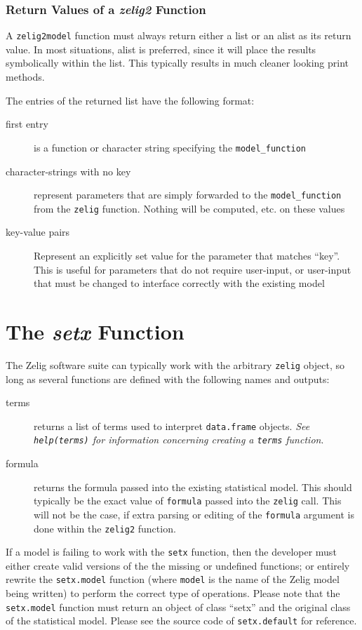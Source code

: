 \documentclass[11pt]{article}
\begin{document}
\subsubsection{Return Values of a \emph{zelig2} Function}

A {\tt zelig2model} function must always return either a list or an alist as its return value.  In most situations, alist is preferred, since it will place the results symbolically within the list.  This typically results in much cleaner looking print methods.

The entries of the returned list have the following format:
\begin{description}
	\item[first entry]{is a function or character string specifying the {\tt model\_function}}
	\item[character-strings with no key]{represent parameters that are simply forwarded to the {\tt model\_function} from the {\tt zelig} function.  Nothing will be computed, etc. on these values}
	\item[key-value pairs]{Represent an explicitly set value for the parameter that matches ``key''.  This is useful for parameters that do not require user-input, or user-input that must be changed to interface correctly with the existing model}
\end{description}


\section{The \emph{setx} Function}
The Zelig software suite can typically work with the arbitrary {\tt zelig} object, so long as several functions are defined with the following names and outputs:

\begin{description}
	\item[terms]{returns a list of terms used to interpret {\tt data.frame} objects.  \emph{See {\tt help(terms)} for information concerning creating a {\tt terms} function}.}
	\item[formula]{returns the formula passed into the existing statistical model.  This should typically be the exact value of {\tt formula} passed into the {\tt zelig} call.  This will not be the case, if extra parsing or editing of the {\tt formula} argument is done within the {\tt zelig2} function.}
\end{description}

If a model is failing to work with the {\tt setx} function, then the developer must either create valid versions of the the missing or undefined functions; or entirely rewrite the {\tt setx.model} function (where {\tt model} is the name of the Zelig model being written) to perform the correct type of operations.  Please note that the {\tt setx.model} function must return an object of class ``setx'' and the original class of the statistical model.  Please see the source code of {\tt setx.default} for reference.
\end{document}
